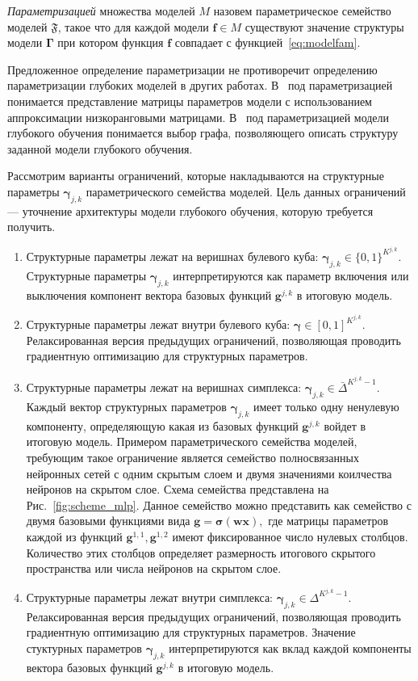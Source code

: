 \begin{defin}
\textit{Параметризацией }множества моделей $M$ назовем параметрическое семейство моделей $\mathfrak{F}$, такое что для каждой модели $\mathbf{f} \in M$ существуют значение структуры модели $\boldsymbol{\Gamma}$ при котором функция $\mathbf{f}$ совпадает с функцией~\eqref{eq:modelfam}.
\end{defin}
Предложенное определение параметризации не противоречит определению параметризации глубоких моделей в других работах. В~\cite{need_prune} под параметризацией понимается представление матрицы параметров модели с использованием аппроксимации низкоранговыми матрицами. В~\cite{generative_graphs} под параметризацией модели глубокого обучения понимается выбор графа, позволяющего описать структуру заданной модели глубокого обучения. 

Рассмотрим варианты ограничений, которые накладываются на структурные параметры $\boldsymbol{\gamma}_{j,k}$ параметрического семейства моделей. Цель данных ограничений --- уточнение архитектуры модели глубокого обучения, которую требуется получить. 
\begin{enumerate}
\item Структурные параметры лежат на веришнах булевого куба: $\boldsymbol{\gamma}_{j,k} \in \{0,1\}^{K^{j,k}}$. Структурные параметры  $\boldsymbol{\gamma}_{j,k}$ интерпретируются как параметр включения или выключения компонент вектора базовых функций $\mathbf{g}^{j,k}$ в итоговую модель.
\item Структурные параметры лежат внутри булевого куба: $\boldsymbol{\gamma} \in [0,1]^{K^{j,k}}$. Релаксированная версия предыдущих ограничений, позволяющая проводить градиентную оптимизацию для структурных параметров.
\item Структурные параметры лежат на веришнах симплекса: $\boldsymbol{\gamma}_{j,k} \in \bar{\Delta}^{K^{j,k}-1}$. Каждый вектор структурных параметров $\boldsymbol{\gamma}_{j,k}$ имеет только одну ненулевую компоненту, определяющую какая из базовых функций $\mathbf{g}^{j,k}$ войдет в итоговую модель. Примером параметрического семейства моделей, требующим такое ограничение является семейство полносвязанных нейронных сетей с одним скрытым слоем и двумя значениями коилчества нейронов на скрытом слое. Схема семейства представлена на Рис.~\ref{fig:scheme_mlp}. Данное семейство можно представить как семейство с двумя базовыми функциями вида $\mathbf{g} = \boldsymbol{\sigma}(\mathbf{w}\mathbf{x}),$ где матрицы параметров каждой из функций  $\mathbf{g}^{1,1}, \mathbf{g}^{1,2}$ имеют фиксированное число нулевых столбцов. Количество этих столбцов определяет размерность итогового скрытого пространства или числа нейронов на скрытом слое.
\item  Структурные параметры лежат внутри симплекса: $\boldsymbol{\gamma}_{j,k} \in {\Delta}^{K^{j,k}-1}$. Релаксированная версия предыдущих ограничений, позволяющая проводить градиентную оптимизацию для структурных параметров. Значение стуктурных параметров $\boldsymbol{\gamma}_{j,k}$ интерпретируются как вклад каждой компоненты вектора базовых функций $\mathbf{g}^{j,k}$ в итоговую модель. 
\end{enumerate}

